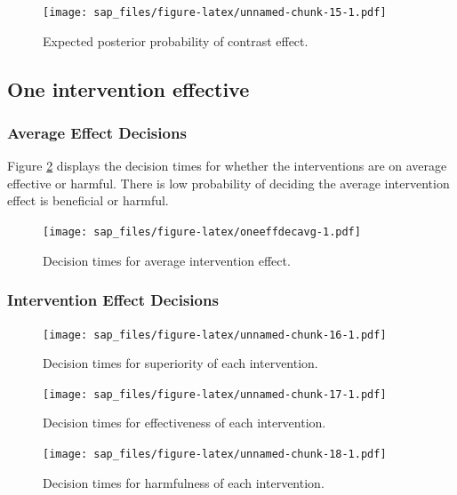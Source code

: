 \documentclass[
  bibliography=totoc]{scrreprt}
\begin{document}
\begin{figure}
\centering
\texttt{[image: sap\_files/figure-latex/unnamed-chunk-15-1.pdf]}
\caption{\label{fig:unnamed-chunk-15}Expected posterior probability of contrast effect.}
\end{figure}

\clearpage

\hypertarget{one-intervention-effective}{%
\subsection{One intervention effective}\label{one-intervention-effective}}

\hypertarget{average-effect-decisions-1}{%
\subsubsection{Average Effect Decisions}\label{average-effect-decisions-1}}

Figure \ref{fig:oneeffdecavg} displays the decision times for whether the interventions are on average effective or harmful.
There is low probability of deciding the average intervention effect is beneficial or harmful.

\begin{figure}
\centering
\texttt{[image: sap\_files/figure-latex/oneeffdecavg-1.pdf]}
\caption{\label{fig:oneeffdecavg}Decision times for average intervention effect.}
\end{figure}

\hypertarget{intervention-effect-decisions-1}{%
\subsubsection{Intervention Effect Decisions}\label{intervention-effect-decisions-1}}

\begin{figure}
\centering
\texttt{[image: sap\_files/figure-latex/unnamed-chunk-16-1.pdf]}
\caption{\label{fig:unnamed-chunk-16}Decision times for superiority of each intervention.}
\end{figure}

\begin{figure}
\centering
\texttt{[image: sap\_files/figure-latex/unnamed-chunk-17-1.pdf]}
\caption{\label{fig:unnamed-chunk-17}Decision times for effectiveness of each intervention.}
\end{figure}

\begin{figure}
\centering
\texttt{[image: sap\_files/figure-latex/unnamed-chunk-18-1.pdf]}
\caption{\label{fig:unnamed-chunk-18}Decision times for harmfulness of each intervention.}
\end{figure}
\end{document}

